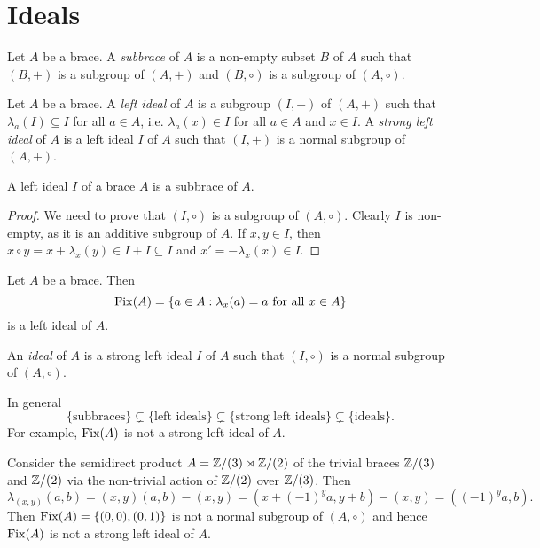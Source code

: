 \chapter{Ideals}
\label{ideals}

\begin{definition}
Let $A$ be a brace. A \emph{subbrace} of $A$ is a non-empty 
subset $B$ of $A$ such that $(B,+)$ is a subgroup of $(A,+)$ and $(B,\circ)$ is a subgroup of $(A,\circ)$. 
\end{definition}

\begin{definition}
    Let $A$ be a brace. A \emph{left ideal} of $A$ is a subgroup $(I,+)$ of
	$(A,+)$ such that $\lambda_a(I)\subseteq I$ for all $a\in A$, i.e. $\lambda_a(x)\in I$ for all $a\in A$ and $x\in I$. A \emph{strong left ideal} of $A$ 
	is a left ideal $I$ of $A$ such that $(I,+)$ is a normal subgroup of $(A,+)$. 
\end{definition}

\begin{proposition}
    A left ideal $I$ of a brace $A$ is a subbrace of $A$. 
\end{proposition}

\begin{proof}
    We need to prove that $(I,\circ)$ is a subgroup of $(A,\circ)$. Clearly $I$ is non-empty, 
    as it is an additive subgroup of $A$. If $x,y\in I$, then
    $x\circ y=x+\lambda_x(y)\in I+I\subseteq I$ and $x'=-\lambda_x(x)\in I$. 
\end{proof}

\begin{example}
    Let $A$ be a brace. Then 
    \[
    \operatorname{Fix}(A)=\{a\in A:\lambda_x(a)=a\text{ for all $x\in A$}\}
    \]
    is a left ideal of $A$. 
\end{example}

\begin{definition}
    An \emph{ideal} of $A$ is a strong left ideal $I$ of $A$ such that 
	$(I,\circ)$ is a normal subgroup of $(A,\circ)$. 
\end{definition}

In general 
\[
\{\text{subbraces}\}\subsetneq \{\text{left ideals}\}\subsetneq\{\text{strong left ideals}\}\subsetneq\{\text{ideals}\}.
\]
For example, $\operatorname{Fix}(A)$ is not a strong left ideal of $A$.

\begin{example}
    Consider the semidirect product $A=\mathbb{Z}/(3)\rtimes \mathbb{Z}/(2)$ of the
    trivial braces $\mathbb{Z}/(3)$ and $\mathbb{Z}/(2)$
    via the non-trivial action of $\mathbb{Z}/(2)$ over $\mathbb{Z}/(3)$.
    Then 
    \[
    \lambda_{(x,y)}(a,b)=(x,y)(a,b)-(x,y)=(x+(-1)^ya,y+b)-(x,y)=((-1)^ya,b).
    \]
    Then $\operatorname{Fix}(A)=\{(0,0),(0,1)\}$ is not a 
    normal subgroup of $(A,\circ)$ and hence $\operatorname{Fix}(A)$ is not a strong left 
    ideal of $A$.
\end{example}

